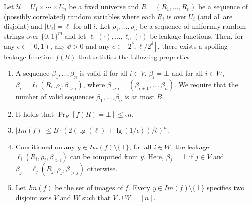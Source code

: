 \begin{theorem} \label{thm:chain_leak_3}  
Let $\mathcal{U} = U_1 \times \cdots \times U_n$ be a fixed universe
and $R = (R_1,\dots,R_n)$ be a sequence of (possibly correlated) random variables where each $R_i$ is over $U_i$ (and all are disjoint) and $|U_i| = \ell$ for all $i$.
Let $\rho_1, \ldots, \rho_n$ be a sequence of uniformly
random strings over $\{0,1\}^m$
and
let $\ell_1(\cdot), \ldots, \ell_n(\cdot)$ be leakage functions.
Then, for any $\epsilon \in (0, 1)$, 
any $\dd > 0$ and any $c \in [2^\delta, \ell/2^\delta]$, 
there exists a spoiling 
leakage function $f(R)$ that satisfies the following properties. 
\begin{enumerate}

    \item A sequence $\beta_1, \ldots, \beta_n$ is valid if 
    for all $i \in V$, $\beta_i = \bot$ and 
    for all $i \in W$, $\beta_i = \ell_i(R_i, \rho_i, \beta_{>i})$, where $\beta_{>i} = (\beta_{i+1}, \ldots, \beta_n)$. 
    We require that the number of valid sequences
    $\beta_1, \ldots, \beta_n$ is at most $B$.
    \item It holds that $\Pr_{R}[f(R) = \bot] \leq \epsilon n$.
    \item $|Im(f)| \leq  B \cdot \left ( 2(\lg(\ell) + \lg (1/\epsilon)) /\delta \right )^{n}$.
    \item Conditioned on any $y \in Im(f) \setminus \{\bot\}$, for all $i \in W$, the leakage 
    $\ell_i(R_i, \rho_i, \beta_{>i})$  
    can be computed from $y$. Here,  $\beta_j = \bot$ if $j \in V$
    and $\beta_j = \ell_j(R_j, \rho_j, \beta_{> j})$ otherwise.
    \item 
    Let $Im(f)$ be the set of images of $f$. 
    Every $y \in Im(f) \setminus \{\bot\}$ specifies two disjoint sets $V$ and $W$ such that $V \cup W = [n]$.

\end{enumerate}
\end{theorem}
